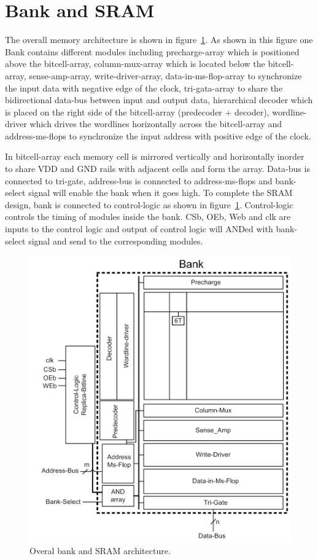 \section{Bank and SRAM}
\label{sec:bank}

The overall memory architecture is shown in figure~\ref{fig:bank}.
As shown in this figure one Bank contains different modules including 
precharge-array which is positioned above the bitcell-array, 
column-mux-array which is located below the bitcell-array, 
sense-amp-array, write-driver-array, data-in-ms-flop-array 
to synchronize the input data with negative edge of the clock, 
tri-gata-array to share the bidirectional data-bus between input 
and output data, hierarchical decoder which is placed on the right side 
of the bitcell-array (predecoder + decoder), wordline-driver which drives 
the wordlines horizontally across the bitcell-array and address-ms-flops 
to synchronize the input address with positive edge of the clock. 

In bitcell-array each memory cell is mirrored vertically and horizontally inorder to share VDD and GND rails with adjacent cells and form the array. 
Data-bus is connected to tri-gate, address-bus is connected to address-ms-flops and bank-select 
signal will enable the bank when it goes high. To complete the SRAM design, bank is connected to control-logic as shown in figure~\ref{fig:bank}. 
Control-logic controls the timing 
of modules inside the bank. CSb, OEb, Web and clk are inputs to the control logic and output of 
control logic will ANDed with bank-select signal and send to the corresponding modules.


\begin{figure}[h!]
\centering
\includegraphics[scale=1]{./figs/bank.pdf}
\caption{Overal bank and SRAM architecture.}
\label{fig:bank}
\end{figure}


